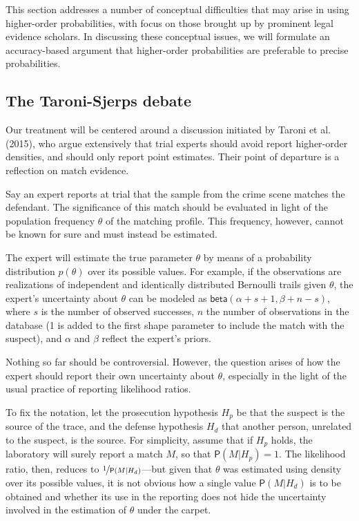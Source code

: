 \documentclass[
  10pt,
  dvipsnames,enabledeprecatedfontcommands]{scrartcl}
\newcommand{\pr}[1]{\mathsf{P}(#1)}
\newcommand{\s}[1]{\mbox{$\mathsf{#1}$}}
\begin{document}
\label{sec:objections}

This section addresses a number of conceptual difficulties that may
arise in using higher-order probabilities, with focus on those brought
up by prominent legal evidence scholars. In discussing these conceptual
issues, we will formulate an accuracy-based argument that higher-order
probabilities are preferable to precise probabilities.

\hypertarget{the-taroni-sjerps-debate}{%
\subsection{The Taroni-Sjerps debate}\label{the-taroni-sjerps-debate}}

Our treatment will be centered around a discussion initiated by Taroni
et al. (2015), who argue extensively that trial experts should avoid
report higher-order densities, and should only report point estimates.
Their point of departure is a reflection on match evidence.

Say an expert reports at trial that the sample from the crime scene
matches the defendant. The significance of this match should be
evaluated in light of the population frequency \(\theta\) of the
matching profile. This frequency, however, cannot be known for sure and
must instead be estimated.

The expert will estimate the true parameter \(\theta\) by means of a
probability distribution \(p(\theta)\) over its possible values. For
example, if the observations are realizations of independent and
identically distributed Bernoulli trails given \(\theta\), the expert's
uncertainty about \(\theta\) can be modeled as
\(\s{beta}(\alpha + s + 1 ,\beta + n - s)\), where \(s\) is the number
of observed successes, \(n\) the number of observations in the database
(1 is added to the first shape parameter to include the match with the
suspect), and \(\alpha\) and \(\beta\) reflect the expert's priors.

Nothing so far should be controversial. However, the question arises of
how the expert should report their own uncertainty about \(\theta\),
especially in the light of the usual practice of reporting likelihood
ratios.

To fix the notation, let the prosecution hypothesis \(H_p\) be that the
suspect is the source of the trace, and the defense hypothesis \(H_d\)
that another person, unrelated to the suspect, is the source. For
simplicity, assume that if \(H_p\) holds, the laboratory will surely
report a match \(M\), so that \(\pr{M\vert H_p}=1\). The likelihood
ratio, then, reduces to \(\nicefrac{1}{\pr{M \vert H_d}}\)---but given
that \(\theta\) was estimated using density over its possible values, it
is not obvious how a single value \(\pr{M \vert H_d}\) is to be obtained
and whether its use in the reporting does not hide the uncertainty
involved in the estimation of \(\theta\) under the carpet.
\end{document}
